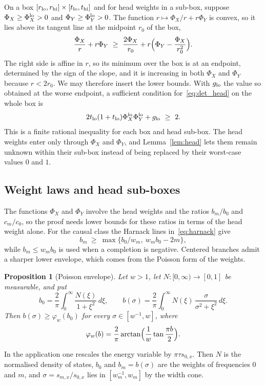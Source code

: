 \documentclass[10pt]{article}
\newtheorem{proposition}[theorem]{Proposition}
\theoremstyle{remark}
\begin{document}
On a box $[r_{\rm lo},r_{\rm hi}]\times[t_{\rm lo},t_{\rm hi}]$ and for head weights in a sub-box, suppose $\Phi_X\ge\Phi_X^{\rm lo}>0$ and $\Phi_Y\ge\Phi_Y^{\rm lo}>0$. The function $r\mapsto\Phi_X/r+r\Phi_Y$ is convex, so it lies above its tangent line at the midpoint $r_0$ of the box,
\[
\frac{\Phi_X}{r}+r\Phi_Y\ \ge\ \frac{2\Phi_X}{r_0}+r\Bigl(\Phi_Y-\frac{\Phi_X}{r_0^2}\Bigr).
\]
The right side is affine in $r$, so its minimum over the box is at an endpoint, determined by the sign of the slope, and it is increasing in both $\Phi_X$ and $\Phi_Y$ because $r<2r_0$. We may therefore insert the lower bounds. With $g_{\rm lo}$ the value so obtained at the worse endpoint, a sufficient condition for~\eqref{eq:det_head} on the whole box is
\begin{equation}\label{eq:rect}
2t_{\rm lo}(1+t_{\rm lo})\Phi_X^{\rm lo}\Phi_Y^{\rm lo}+g_{\rm lo}\ \ge\ 2 .
\end{equation}
This is a finite rational inequality for each box and head sub-box. The head weights enter only through $\Phi_X$ and $\Phi_Y$, and Lemma~\ref{lem:head} lets them remain unknown within their sub-box instead of being replaced by their worst-case values $0$ and $1$.

\subsection{Weight laws and head sub-boxes}\label{sec:weights}

The functions $\Phi_X$ and $\Phi_Y$ involve the head weights and the ratios $b_m/b_0$ and $c_m/c_0$, so the proof needs lower bounds for these ratios in terms of the head weight alone. For the causal class the Harnack lines in~\eqref{eq:harnack} give
\[
b_m\ \ge\ \max\bigl\{b_0/w_m,\ w_mb_0-2m\bigr\},
\]
while $b_m\le w_mb_0$ is used when a completion is negative. Centered branches admit a sharper lower envelope, which comes from the Poisson form of the weights.

\begin{proposition}[Poisson envelope]\label{prop:poisson}
Let $w>1$, let $N:[0,\infty)\to[0,1]$ be measurable, and put
\[
b_0=\frac2\pi\int_0^\infty\frac{N(\xi)}{1+\xi^2}\,d\xi,\qquad
b(\sigma)=\frac2\pi\int_0^\infty N(\xi)\,\frac{\sigma}{\sigma^2+\xi^2}\,d\xi .
\]
Then $b(\sigma)\ge\varphi_w(b_0)$ for every $\sigma\in[w^{-1},w]$, where
\[
\varphi_w(b)=\frac2\pi\arctan\Bigl(\frac1w\tan\frac{\pi b}2\Bigr).
\]
\end{proposition}

In the application one rescales the energy variable by $\pi\tau s_{0,x}$. Then $N$ is the normalised density of states, $b_0$ and $b_m=b(\sigma)$ are the weights of frequencies $0$ and $m$, and $\sigma=s_{m,x}/s_{0,x}$ lies in $[w_m^{-1},w_m]$ by the width cone.
\end{document}

